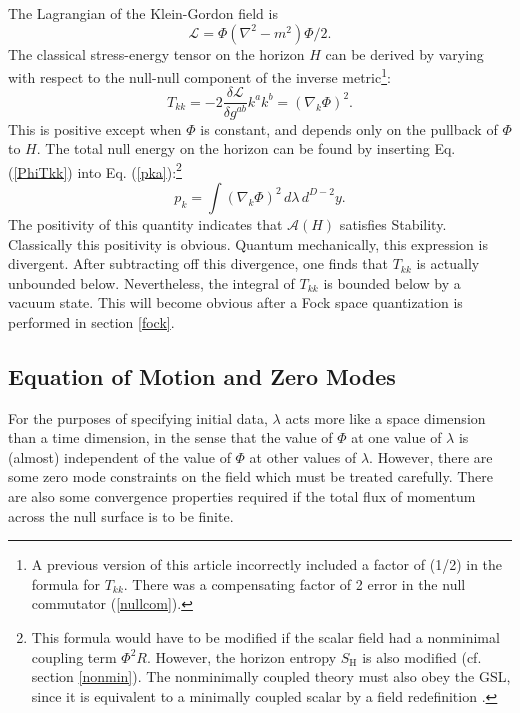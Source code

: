 \documentclass{article}
\begin{document}
The Lagrangian of the Klein-Gordon field is
\begin{equation}
\mathcal{L} = \Phi(\nabla^2 - m^2)\Phi /2.
\end{equation}
The classical stress-energy tensor on the horizon $H$ can be derived by varying with respect to the null-null component of the inverse metric\footnote{A previous version of this article incorrectly included a factor of (1/2) in the formula for $T_{kk}$.  There was a compensating factor of 2 error in the null commutator (\ref{nullcom}).}:
\begin{equation}\label{PhiTkk}
T_{kk} = -2\frac{\mathcal{\delta L}}{\delta g^{ab}} k^a k^b = (\nabla_k \Phi)^2.
\end{equation}
This is positive except when $\Phi$ is constant, and depends only on the pullback of $\Phi$ to $H$.  The total null energy on the horizon can be found by inserting Eq. (\ref{PhiTkk}) into Eq. (\ref{pka}):\footnote{This formula would have to be modified if the scalar field had a nonminimal coupling term $\Phi^2 R$.  However, the horizon entropy $S_\mathrm{H}$ is also modified (cf. section \ref{nonmin}).  The nonminimally coupled theory must also obey the GSL, since it is equivalent to a minimally coupled scalar by a field redefinition \cite{2ndlaw}.}
\begin{equation}\label{nullE}
p_k = \int (\nabla_k \Phi)^2\,d\lambda\,d^{D-2}y.
\end{equation}
The positivity of this quantity indicates that $\mathcal{A}(H)$ satisfies Stability.  Classically this positivity is obvious.  Quantum mechanically, this expression is divergent.  After subtracting off this divergence, one finds that $T_{kk}$ is actually unbounded below.  Nevertheless, the integral of $T_{kk}$ is bounded below by a vacuum state.  This will become obvious after a Fock space quantization is performed in section \ref{fock}.

\subsection{Equation of Motion and Zero Modes}

For the purposes of specifying initial data, $\lambda$ acts more like a space dimension than a time dimension, in the sense that the value of $\Phi$ at one value of $\lambda$ is (almost) independent of the value of $\Phi$ at other values of $\lambda$.  However, there are some zero mode constraints on the field which must be treated carefully.  There are also some convergence properties required if the total flux of momentum across the null surface is to be finite.
\end{document}
